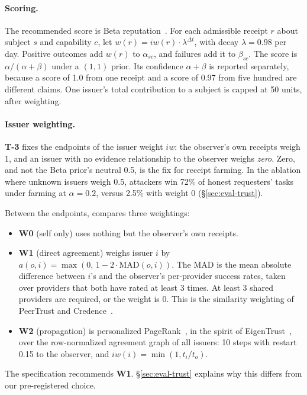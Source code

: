 \paragraph{Scoring.}
The recommended score is Beta reputation~\cite{josang2002beta}. For each
admissible receipt $r$ about subject $s$ and capability $c$, let
$w(r) = \mathit{iw}(r)\cdot\lambda^{\Delta t}$, with decay
$\lambda = 0.98$ per day. Positive outcomes add $w(r)$ to $\alpha_{sc}$,
and failures add it to $\beta_{sc}$. The score is
$\alpha/(\alpha+\beta)$ under a $(1,1)$ prior. Its confidence
$\alpha+\beta$ is reported separately, because a score of 1.0 from one
receipt and a score of 0.97 from five hundred are different claims.
One issuer's total contribution to a subject is capped at 50 units, after
weighting.

\paragraph{Issuer weighting.}
\textbf{T-3} fixes the endpoints of the issuer weight $\mathit{iw}$: the
observer's own receipts weigh 1, and an issuer with no evidence
relationship to the observer weighs \emph{zero}. Zero, and not the
Beta prior's neutral 0.5, is the fix for receipt farming. In the ablation
where unknown issuers weigh 0.5, attackers win 72\% of honest requesters'
tasks under farming at $\alpha{=}0.2$, versus 2.5\% with weight 0
(\S\ref{sec:eval-trust}).

Between the endpoints, \sys{} compares three weightings:
\begin{itemize}
\item \textbf{W0} (self only) uses nothing but the observer's own
  receipts.
\item \textbf{W1} (direct agreement) weighs issuer $i$ by
  $a(o,i)=\max(0,\,1-2\cdot\mathrm{MAD}(o,i))$. The MAD is the mean
  absolute difference between $i$'s and the observer's per-provider
  success rates, taken over providers that both have rated at least 3
  times. At least 3 shared providers are required, or the weight is 0.
  This is the similarity weighting of PeerTrust and
  Credence~\cite{xiong2004peertrust,walsh2006credence}.
\item \textbf{W2} (propagation) is personalized
  PageRank~\cite{page1999pagerank}, in the spirit of
  EigenTrust~\cite{kamvar2003eigentrust}, over the row-normalized
  agreement graph of all issuers: 10 steps with restart 0.15 to the
  observer, and $\mathit{iw}(i)=\min(1,t_i/t_o)$.
\end{itemize}
The specification recommends \textbf{W1}. \S\ref{sec:eval-trust} explains
why this differs from our pre-registered choice.

